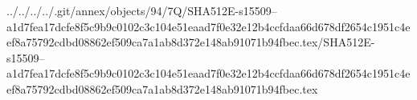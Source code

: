 ../../../../.git/annex/objects/94/7Q/SHA512E-s15509--a1d7fea17dcfe8f5c9b9c0102c3c104e51eaad7f0e32e12b4ccfdaa66d678df2654c1951c4eef8a75792cdbd08862ef509ca7a1ab8d372e148ab91071b94fbec.tex/SHA512E-s15509--a1d7fea17dcfe8f5c9b9c0102c3c104e51eaad7f0e32e12b4ccfdaa66d678df2654c1951c4eef8a75792cdbd08862ef509ca7a1ab8d372e148ab91071b94fbec.tex